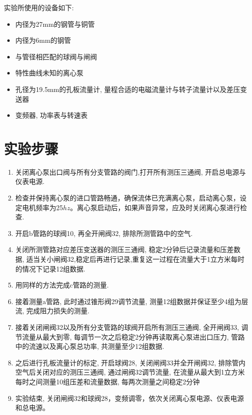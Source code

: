 \documentclass[a4paper,UTF8]{ctexrep}
\theoremstyle{plain}
\theoremstyle{definition}
\numberwithin{equation}{chapter}
\begin{document}
    实验所使用的设备如下:
    
    
\begin{itemize}
    \item 内径为27mm的钢管与铜管
    \item 内径为6mm的钢管
    \item 与管径相匹配的球阀与闸阀
    \item 特性曲线未知的离心泵
    \item 孔径为19.5mm的孔板流量计, 量程合适的电磁流量计与转子流量计以及差压变送器
    \item 变频器, 功率表与转速表
\end{itemize}


        \section{实验步骤}

        \begin{enumerate}
            \item 关闭离心泵出口阀与所有分支管路的阀门,打开所有测压三通阀, 开启总电源与仪表电源.
            \item 检查并保持离心泵的进口管路畅通，确保流体已充满离心泵，启动离心泵，设定电机频率为25$hz$。离心泵启动后，如果声音异常，应及时关闭离心泵进行检查.
            \item 开启b管路的球阀10, 再全开闸阀32, 排除所测管路中的空气.
            \item 关闭所测管路对应差压变送器的测压三通阀, 稳定2分钟后记录流量和压差数据, 适当关小闸阀32,稳定后再进行记录,重复这一过程在流量大于1立方米每时的情况下记录12组数据.
            \item 用同样的方法完成c管路的测量.
            \item 接着测量a管路, 此时通过锥形阀29调节流量, 测量12组数据并保证至少4组为层流, 完成阻力损失的测量.
            \item 接着关闭闸阀32以及所有分支管路的球阀开启所有测压三通阀, 全开闸阀33, 调节流量从最大到零, 每调节一次之后稳定2分钟再读取离心泵进出口压力, 管路中的流速以及离心泵总功率, 共测量至少12组数据. 
            \item 之后进行孔板流量计的标定, 开启球阀28, 关闭闸阀33并全开闸阀32, 排除管内空气后关闭对应的测压三通阀, 通过闸阀32调节流量, 在流量从最大到1立方米每时之间测量10组压差和流量数据, 每两次测量之间稳定2分钟
            \item 实验结束, 关闭闸阀32和球阀28，变频调零，依次关闭离心泵电源、仪表电源和总电源。
        \end{enumerate}
\newpage
\end{document}
